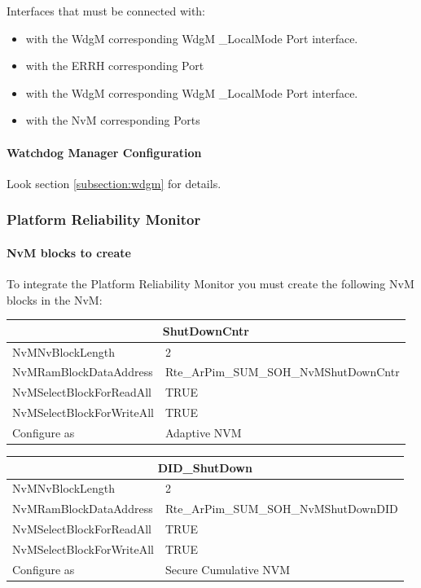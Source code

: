 Interfaces that must be connected with:

\begin{itemize}
    \item {} with the WdgM corresponding WdgM \_LocalMode Port interface.
    \item {} with the ERRH corresponding Port
	\item {} with the WdgM corresponding WdgM \_LocalMode Port interface.
    \item {} with the NvM corresponding Ports
\end{itemize}

\paragraph{Watchdog Manager Configuration}
Look section \ref{subsection:wdgm} for details.

\subsubsection{Platform Reliability Monitor}
\label{subsec:PlatformReliabilityMonitor}

\paragraph{NvM blocks to create}
To integrate the Platform Reliability Monitor you must create the following NvM blocks in the NvM:

\begin{tabular}{|l|p{8cm}|}\hline
\multicolumn{2}{|c|}{\textbf{ShutDownCntr}}\\\hline
NvMNvBlockLength&2\\\hline
NvMRamBlockDataAddress&Rte\_ArPim\_SUM\_SOH\_NvMShutDownCntr\\\hline
NvMSelectBlockForReadAll&TRUE\\\hline
NvMSelectBlockForWriteAll&TRUE\\\hline
Configure as&Adaptive NVM\\\hline
\end{tabular}

\begin{tabular}{|l|p{8cm}|}\hline
\multicolumn{2}{|c|}{\textbf{DID\_ShutDown}}\\\hline
NvMNvBlockLength&2\\\hline
NvMRamBlockDataAddress&Rte\_ArPim\_SUM\_SOH\_NvMShutDownDID\\\hline
NvMSelectBlockForReadAll&TRUE\\\hline
NvMSelectBlockForWriteAll&TRUE\\\hline
Configure as&Secure Cumulative NVM\\\hline
\end{tabular}

